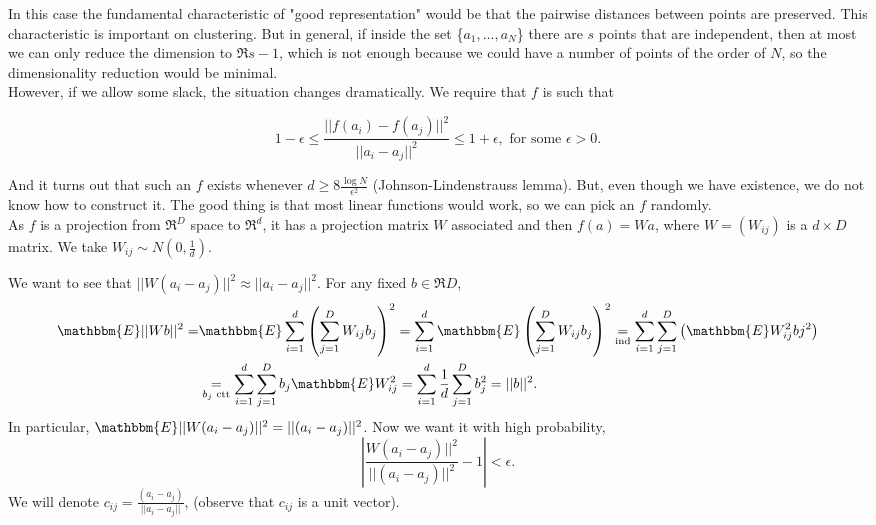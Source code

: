\documentclass[11pt, english]{article}
\begin{document}
In this case the fundamental characteristic of "good representation" would be that the pairwise distances between points are preserved. This characteristic is important on clustering. But in general, if inside the set \{$a_1,\dots,a_N$\} there are $s$ points that are independent, then at most we can only reduce the dimension to $\Re{s-1}$, which is not enough because we could have a number of points of the order of $N$, so the dimensionality reduction would be minimal.\\

However, if we allow some slack, the situation changes dramatically. We require that $f$ is such that

\begin{equation}
	1-\epsilon\leq\frac{||f(a_i)-f(a_j)||^2}{||a_i-a_j||^2}\leq 1+\epsilon, \text{ for some }\epsilon>0. 
\end{equation}

And it turns out that such an $f$ exists whenever $d\geq 8\frac{\log N}{\epsilon^2}$ (Johnson-Lindenstrauss lemma). But, even though we have existence, we do not know how to construct it. The good thing is that most linear functions would work, so we can pick an $f$ randomly. \\

As $f$ is a projection from $\Re^D$ space to $\Re^d$, it has a projection matrix $W$ associated and then $f(a)=Wa$, where $W=(W_{ij})$ is a $d\times D$ matrix. We take $W_{ij}\sim N(0,\frac{1}{d})$.

We want to see that $||W(a_i-a_j)||^2\approx ||a_i-a_j||^2$. For any fixed $b\in \Re{D}$, 
\begin{align}
	\mathbbm{E}||Wb||^2= & \mathbbm{E}\sum\limits_{i=1}^d\left(\sum\limits_{j=1}^D W_{ij}b_j\right)^2=\sum\limits_{i=1}^d\mathbbm{E}\left(\sum\limits_{j=1}^DW_{ij}b_j\right)^2  \underset{\text{ind}}{=}\sum\limits_{i=1}^d\sum\limits_{j=1}^D\left(\mathbbm{E}W_{ij}^2bj^2\right)\\
	& \underset{b_j\text{ ctt}}{=}\sum\limits_{i=1}^d\sum\limits_{j=1}^Db_j\mathbbm{E}W_{ij}^2=\sum_{i=1}^d\frac{1}{d}\sum\limits_{j=1}^Db_j^2=||b||^2.
\end{align}
In particular, $\mathbbm{E}||W(a_i-a_j)||^2=||(a_i-a_j)||^2$. Now we want it with high probability,
\begin{equation}
	\left\lvert\frac{W(a_i-a_j)||^2}{||(a_i-a_j)||^2}-1\right\lvert<\epsilon.
\end{equation}
We will denote $c_{ij}=\frac{(a_i-a_j)}{||a_i-a_j||}$, (observe that $c_{ij}$ is a unit vector).
	
\end{document}
